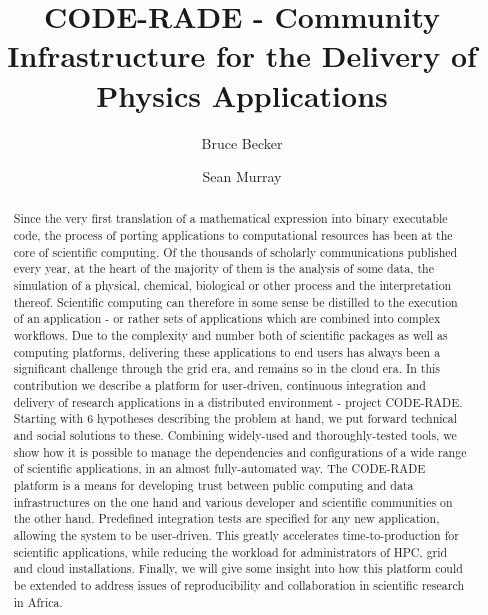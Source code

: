 \documentclass[a4paper]{jpconf}
\begin{document}
\title{CODE-RADE - Community Infrastructure for the Delivery of Physics Applications}

\author{Bruce Becker}
\address{C.S.I.R. Building 43 \\ 1 Meiring Naude Road \\ Brummeria \\ Pretoria \\ 0001}

\author{Sean Murray}
\address{C.H.P.C. \\ Rosebank \\ Cape Town \\ 7700}


\begin{abstract}
Since the very first translation of a mathematical expression into binary executable code, the process of porting applications to computational resources has been at the core of scientific computing. Of the thousands of scholarly communications published every year, at the heart of the majority of them is the analysis of some data, the simulation of a physical, chemical, biological or other process and the interpretation thereof. Scientific computing can therefore in some sense be distilled to the execution of an application - or rather sets of applications which are combined into complex workflows. Due to the complexity and number both of scientific packages as well as computing platforms, delivering these applications to end users has always been a significant challenge through the grid era, and remains so in the cloud era. In this contribution we describe a platform for user-driven, continuous integration and delivery of research applications in a distributed environment - project CODE-RADE. Starting with 6 hypotheses describing the problem at hand, we put forward technical and social solutions to these. Combining widely-used and thoroughly-tested tools, we show how it is possible to manage the dependencies and configurations of a wide range of scientific applications, in an almost fully-automated way. The CODE-RADE platform is a means for developing trust between public computing and data infrastructures on the one hand and various developer and scientific communities on the other hand. Predefined integration tests are specified for any new application, allowing the system to be user-driven. This greatly accelerates time-to-production for scientific applications, while reducing the workload for administrators of HPC, grid and cloud installations. Finally, we will give some insight into how this platform could be extended to address issues of reproducibility and collaboration in scientific research in Africa.\end{abstract}
\end{document}
